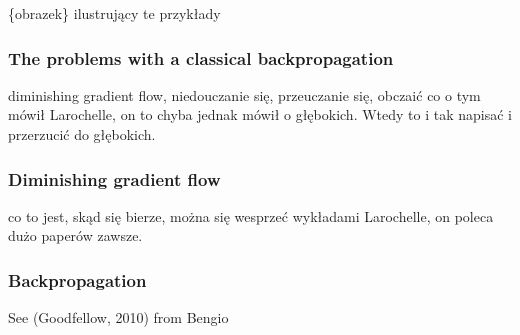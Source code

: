 \documentclass[a4paper,10pt]{report}
\begin{document}
      \{obrazek\} ilustrujący te przykłady 
      
  
	\subsubsection{The problems with a classical backpropagation} %
	  diminishing gradient flow, niedouczanie się, przeuczanie się, obczaić co o tym mówił Larochelle, on to chyba jednak mówił o głębokich. Wtedy to i tak napisać i przerzucić do głębokich. 
	
	\subsubsection{Diminishing gradient flow} %
	  co to jest, skąd się bierze, można się wesprzeć wykładami Larochelle, on poleca dużo paperów zawsze. 
	  
	\subsubsection{Backpropagation} %
	  See (Goodfellow, 2010) from Bengio 
	
	

    
\end{document}
